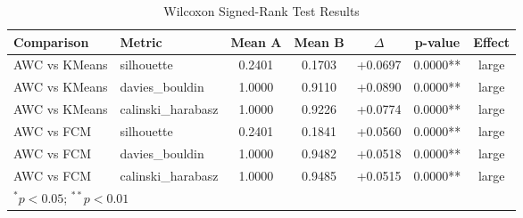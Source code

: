 \begin{table}[ht]
\centering
\caption{Wilcoxon Signed-Rank Test Results}
\label{tab:wilcoxon}
\begin{tabular}{llccccc}
\hline
Comparison & Metric & Mean A & Mean B & $\Delta$ & p-value & Effect \\
\hline
  AWC vs KMeans & silhouette & 0.2401 & 0.1703 & +0.0697 & 0.0000** & large \\
  AWC vs KMeans & davies_bouldin & 1.0000 & 0.9110 & +0.0890 & 0.0000** & large \\
  AWC vs KMeans & calinski_harabasz & 1.0000 & 0.9226 & +0.0774 & 0.0000** & large \\
  AWC vs FCM & silhouette & 0.2401 & 0.1841 & +0.0560 & 0.0000** & large \\
  AWC vs FCM & davies_bouldin & 1.0000 & 0.9482 & +0.0518 & 0.0000** & large \\
  AWC vs FCM & calinski_harabasz & 1.0000 & 0.9485 & +0.0515 & 0.0000** & large \\
\hline
\multicolumn{7}{l}{$^{*}p<0.05$; $^{**}p<0.01$} \\
\end{tabular}
\end{table}